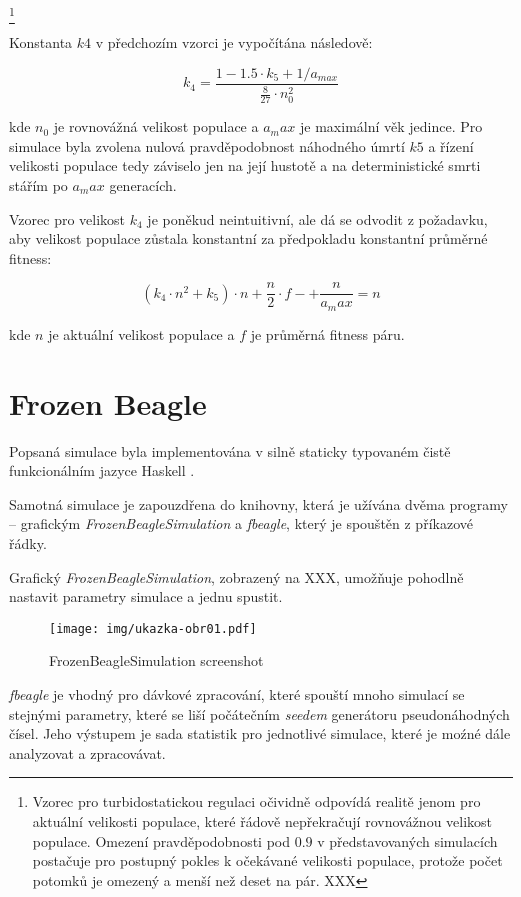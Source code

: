 \footnote{Vzorec pro turbidostatickou regulaci očividně odpovídá realitě jenom pro aktuální velikosti populace,
které řádově nepřekračují rovnovážnou velikost populace. Omezení pravděpodobnosti pod $0.9$ v představovaných
simulacích postačuje pro postupný pokles k očekávané velikosti populace, protože počet potomků je omezený a
menší než deset na pár. XXX}

Konstanta $k4$ v předchozím vzorci je vypočítána následově:

$$k_4 = \frac{1 - 1.5{\cdot}{k_5 + 1/{a_{max}}}}
             {\frac{8}{27}\cdot{n_0^2}}$$

kde $n_0$ je rovnovážná velikost populace a $a_max$ je maximální věk jedince.
Pro simulace byla zvolena nulová pravděpodobnost náhodného úmrtí $k5$ a řízení velikosti populace tedy záviselo jen na
její hustotě a na deterministické smrti stářím po $a_max$ generacích.

Vzorec pro velikost $k_4$ je poněkud neintuitivní, ale dá se odvodit z požadavku, aby velikost populace zůstala
konstantní za předpokladu konstantní průměrné fitness:

\begin{equation}
(k_4\cdot{n^2} + {k_5})\cdot{n} + \frac{n}{2}\cdot{f} - + \frac{n}{a_max} = n
\end{equation}

kde $n$ je aktuální velikost populace a $f$ je průměrná fitness páru.


\section{Frozen Beagle}

Popsaná simulace byla implementována v silně staticky typovaném čistě funkcionálním jazyce Haskell \citep{Haskell}.

Samotná simulace je zapouzdřena do knihovny, která je užívána dvěma programy -- grafickým
\textit{FrozenBeagleSimulation} a \textit{fbeagle}, který je spouštěn z příkazové řádky.

Grafický \textit{FrozenBeagleSimulation}, zobrazený na XXX,
umožňuje pohodlně nastavit parametry simulace a jednu spustit.



\begin{figure}
\centering
\texttt{[image: img/ukazka-obr01.pdf]}
    \caption{FrozenBeagleSimulation screenshot}
\end{figure}


\textit{fbeagle} je vhodný pro dávkové zpracování, které spouští mnoho simulací se stejnými parametry, které se liší počátečním \textit{seedem} generátoru pseudonáhodných čísel. Jeho výstupem je sada statistik pro jednotlivé simulace, které je moźné dále analyzovat a zpracovávat.

